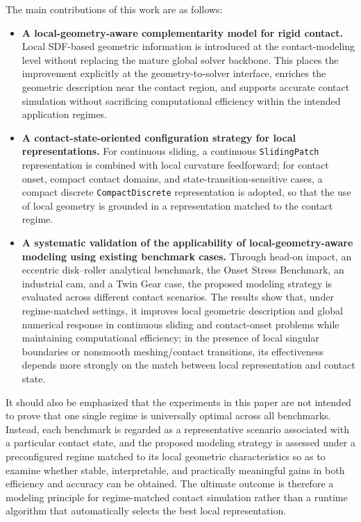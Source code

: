 The main contributions of this work are as follows:
\begin{itemize}
    \item \textbf{A local-geometry-aware complementarity model for rigid contact.} Local SDF-based geometric information is introduced at the contact-modeling level without replacing the mature global solver backbone. This places the improvement explicitly at the geometry-to-solver interface, enriches the geometric description near the contact region, and supports accurate contact simulation without sacrificing computational efficiency within the intended application regimes.
    \item \textbf{A contact-state-oriented configuration strategy for local representations.} For continuous sliding, a continuous \texttt{SlidingPatch} representation is combined with local curvature feedforward; for contact onset, compact contact domains, and state-transition-sensitive cases, a compact discrete \texttt{CompactDiscrete} representation is adopted, so that the use of local geometry is grounded in a representation matched to the contact regime.
    \item \textbf{A systematic validation of the applicability of local-geometry-aware modeling using existing benchmark cases.} Through head-on impact, an eccentric disk--roller analytical benchmark, the Onset Stress Benchmark, an industrial cam, and a Twin Gear case, the proposed modeling strategy is evaluated across different contact scenarios. The results show that, under regime-matched settings, it improves local geometric description and global numerical response in continuous sliding and contact-onset problems while maintaining computational efficiency; in the presence of local singular boundaries or nonsmooth meshing/contact transitions, its effectiveness depends more strongly on the match between local representation and contact state.
\end{itemize}

It should also be emphasized that the experiments in this paper are not intended to prove that one single regime is universally optimal across all benchmarks. Instead, each benchmark is regarded as a representative scenario associated with a particular contact state, and the proposed modeling strategy is assessed under a preconfigured regime matched to its local geometric characteristics so as to examine whether stable, interpretable, and practically meaningful gains in both efficiency and accuracy can be obtained. The ultimate outcome is therefore a modeling principle for regime-matched contact simulation rather than a runtime algorithm that automatically selects the best local representation.
